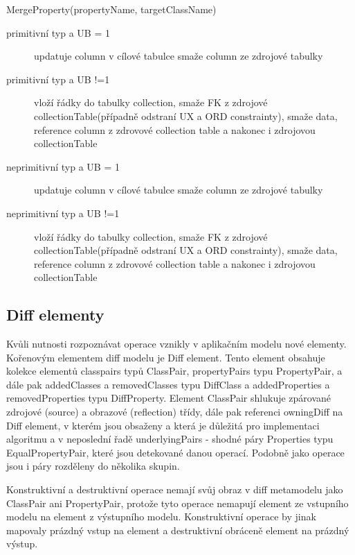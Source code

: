 \documentclass[11pt,twoside,a4paper]{book}
\begin{document}
\begin{list}{Operace :}{}
\item MergeProperty(propertyName, targetClassName) 
\begin{description}
	\item[primitivní typ a UB = 1] updatuje column v cílové tabulce smaže column ze
	zdrojové tabulky
	\item[primitivní typ a UB !=1] vloží řádky do tabulky collection, smaže FK
	z zdrojové collectionTable(případně odstraní UX a ORD
	constrainty), smaže data, reference column z zdrovové
	collection table a nakonec i zdrojovou collectionTable
	\item[neprimitivní typ a UB = 1] updatuje column v cílové tabulce smaže column ze
	zdrojové tabulky
	\item[neprimitivní typ a UB !=1] vloží řádky do tabulky collection, smaže FK
	z zdrojové collectionTable(případně odstraní UX a ORD
	constrainty), smaže data, reference column z zdrovové
	collection table a nakonec i zdrojovou collectionTable
\end{description}
  
\end{list}




\subsection{Diff elementy}

 Kvůli nutnosti rozpoznávat operace vznikly v aplikačním modelu nové
 elementy. Kořenovým elementem diff modelu je Diff element. Tento element
 obsahuje kolekce elementů classpairs typů ClassPair, propertyPairs
 typu PropertyPair, a dále pak addedClasses a removedClasses typu DiffClass a
 addedProperties a removedProperties typu DiffProperty. Element ClassPair
 shlukuje zpárované zdrojové (source) a obrazové (reflection) třídy, dále pak
 referenci owningDiff na Diff element, v kterém jsou obsaženy a která je
 důležitá pro implementaci algoritmu a v neposlední řadě underlyingPairs -
 shodné páry Properties typu EqualPropertyPair, které jsou detekované danou
 operací. Podobně jako operace jsou i páry rozděleny do několika skupin.
 
 Konstruktivní a destruktivní operace nemají svůj obraz v diff metamodelu jako
 ClassPair ani PropertyPair, protože tyto operace nemapují element ze vstupního
 modelu na element z výstupního modelu. Konstruktivní operace by jinak mapovaly
 prázdný vstup na element a destruktivní obráceně element na prázdný výstup.
 
\end{document}
